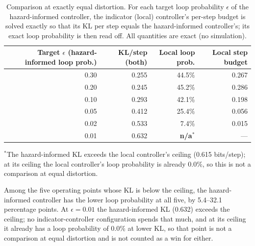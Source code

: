 \begin{table}[ht]
\centering
\caption{Comparison at exactly equal distortion. For each target loop probability $\epsilon$ of the hazard-informed controller, the indicator (local) controller's per-step budget is solved exactly so that its KL per step equals the hazard-informed controller's; its exact loop probability is then read off. All quantities are exact (no simulation).}
\label{tab:synthetic}
\begin{tabular}{@{}rrrr@{}}
\toprule
Target $\epsilon$ (hazard-informed loop prob.) & KL/step (both) & Local loop prob. & Local step budget \\
\midrule
0.30 & 0.255 & 44.5\% & 0.267 \\
0.20 & 0.245 & 45.2\% & 0.286 \\
0.10 & 0.293 & 42.1\% & 0.198 \\
0.05 & 0.412 & 25.4\% & 0.056 \\
0.02 & 0.533 & 7.4\% & 0.015 \\
0.01 & 0.632 & \textbf{n/a}$^{*}$ & --- \\
\bottomrule
\end{tabular}

\vspace{4pt}
{\footnotesize $^{*}$The hazard-informed KL exceeds the local controller's ceiling (0.615 bits/step); at its ceiling the local controller's loop probability is already 0.0\%, so this is not a comparison at equal distortion.}
\end{table}

Among the five operating points whose KL is below the ceiling, the hazard-informed controller has the lower loop probability at all five, by 5.4--32.1 percentage points. At $\epsilon{=}0.01$ the hazard-informed KL (0.632) exceeds the ceiling; no indicator-controller configuration spends that much, and at its ceiling it already has a loop probability of 0.0\% at lower KL, so that point is not a comparison at equal distortion and is not counted as a win for either.

